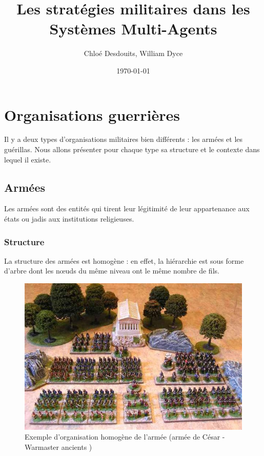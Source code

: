 \documentclass{article}
\title{Les stratégies militaires dans les Systèmes Multi-Agents}
\author{Chloé Desdouits, William Dyce}
\date{\today}
\begin{document}
\maketitle

\tableofcontents
\newpage


\section{Organisations guerrières}
Il y a deux types d'organisations militaires bien différents : les armées et les guérillas. Nous allons présenter pour chaque type sa structure et le contexte dans lequel il existe.

\subsection{Armées}
Les armées sont des entités qui tirent leur légitimité de leur appartenance aux états ou jadis aux institutions religieuses.

\subsubsection{Structure}
La structure des armées est homogène : en effet, la hiérarchie est sous forme d'arbre dont les nœuds du même niveau ont le même nombre de fils.
\begin{figure}[H]
	\begin{centering}
	\includegraphics[width=0.8\linewidth]{../ressources/armee_cesar}
	\caption{Exemple d'organisation homogène de l'armée (armée de César - Warmaster ancients \cite{armee_de_cesar})}
	\end{centering}
\end{figure}
\end{document}
